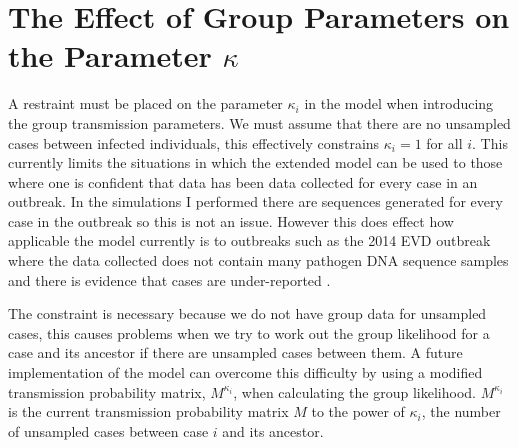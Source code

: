 \documentclass[11pt,a4paper]{report}
\begin{document}
\section{The Effect of Group Parameters on the Parameter $\kappa$}
A restraint must be placed on the parameter $\kappa_i$ in the model when introducing the group transmission parameters. We must assume that there are no unsampled cases between infected individuals, this effectively constrains $\kappa_i=1$ for all $i$. This currently limits the situations in which the extended model can be used to those where one is confident that data has been data collected for every case in an outbreak. In the simulations I performed there are sequences generated for every case in the outbreak so this is not an issue. However this does effect how applicable the model currently is to outbreaks such as the 2014 EVD outbreak where the data collected does not contain many pathogen DNA sequence samples and there is evidence that cases are under-reported \citep{Ebola14}.

The constraint is necessary because we do not have group data for unsampled cases, this causes problems when we try to work out the group likelihood for a case and its ancestor if there are unsampled cases between them. A future implementation of the model can overcome this difficulty by using a modified transmission probability matrix, $M^{\kappa_i}$, when calculating the group likelihood. $M^{\kappa_i}$ is the current transmission probability matrix $M$ to the power of $\kappa_i$, the number of unsampled cases between case $i$ and its ancestor.
\end{document}
